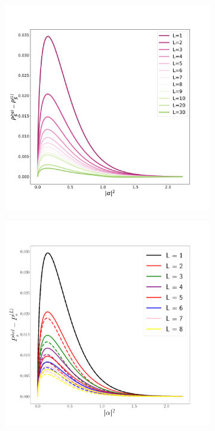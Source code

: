 \begin{figure}[t!]
    \centering
    \begin{subfigure}[b]{0.49\textwidth}
        \centering
        \includegraphics[width=1.\textwidth]{Figures/314/34_dp_results.pdf}
        \caption{}
        \label{fig:dpre1}
    \end{subfigure}
    \begin{subfigure}[b]{0.49\textwidth}
        \centering
        \includegraphics[width=1.\textwidth]{Figures/314/paper_dp_results_notation.png}

\end{subfigure}
\end{figure}
